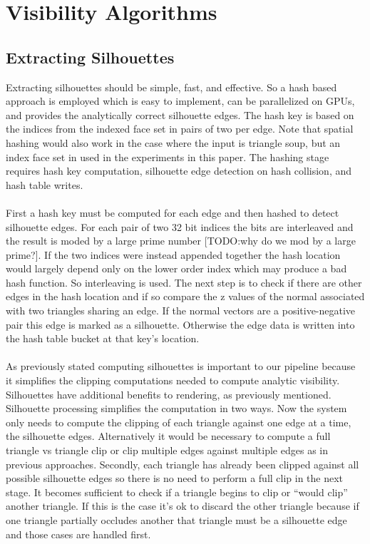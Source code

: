 \documentclass[review]{acmsiggraph}
\begin{document}
\section{Visibility Algorithms}
\subsection{Extracting Silhouettes}
Extracting silhouettes should be simple, fast, and effective. So a hash based approach is employed which is easy to implement, can be parallelized on GPUs, and provides the analytically correct silhouette edges. The hash key is based on the indices from the indexed face set in pairs of two per edge. Note that spatial hashing would also work in the case where the input is triangle soup, but an index face set in used in the experiments in this paper. The hashing stage requires hash key computation, silhouette edge detection on hash collision, and hash table writes.
\\\\
First a hash key must be computed for each edge and then hashed to detect silhouette edges. For each pair of two 32 bit indices the bits are interleaved and the result is moded by a large prime number [TODO:why do we mod by a large prime?]. If the two indices were instead appended together the hash location would largely depend only on the lower order index which may produce a bad hash function. So interleaving is used. The next step is to check if there are other edges in the hash location and if so compare the z values of the normal associated with two triangles sharing an edge. If the normal vectors are a positive-negative pair this edge is marked as a silhouette. Otherwise the edge data is written into the hash table bucket at that key’s location. 
\\\\
As previously stated computing silhouettes is important to our pipeline because it simplifies the clipping computations needed to compute analytic visibility. Silhouettes have additional benefits to rendering, as previously mentioned. Silhouette processing simplifies the computation in two ways. Now the system only needs to compute the clipping of each triangle against one edge at a time, the silhouette edges. Alternatively it would be necessary to compute a full triangle vs triangle clip or clip multiple edges against multiple edges as in previous approaches. Secondly, each triangle has already been clipped against all possible silhouette edges so there is no need to perform a full clip in the next stage. It becomes sufficient to check if a triangle begins to clip or “would clip” another triangle. If this is the case it’s ok to discard the other triangle because if one triangle partially occludes another that triangle must be a silhouette edge and those cases are handled first.
\\\\
\end{document}
